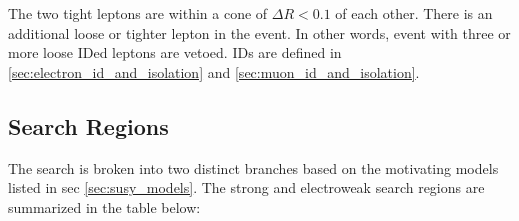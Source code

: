       \begin{description}
         The two tight leptons are within a cone of $\Delta R < 0.1$ of each other.
         There is an additional loose or tighter lepton in the event. In other words, event with three or more loose IDed leptons are vetoed. IDs are defined in \ref{sec:electron_id_and_isolation} and \ref{sec:muon_id_and_isolation}. 
      \end{description}



  \subsection{Search Regions} \label{sec:search_regions}
    The search is broken into two distinct branches based on the motivating models listed in sec \ref{sec:susy_models}. The strong and electroweak search regions are summarized in the table below:

